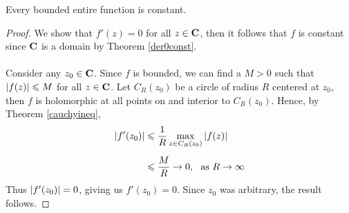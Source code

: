 \begin{theorem}\label{liouville}
Every bounded entire function is constant. 
\end{theorem}
\begin{proof}
We show that $f'(z) = 0$ for all $z \in \mathbf C$, then it follows that $f$ is constant since $\mathbf C$ is a domain by Theorem \ref{der0const}.\\
\\
Consider any $z_0 \in \mathbf C$. Since $f$ is bounded, we can find a $M>0$ such that $\left\lvert f(z)\right\rvert \leqslant M$ for all $z \in \mathbf C$. Let $C_R(z_0)$ be a circle of radius $R$ centered at $z_0$, then $f$ is holomorphic at all points on and interior to $C_R(z_0)$. Hence, by Theorem \ref{cauchyineq},
\begin{align*}
\left\lvert f'(z_0)\right\rvert &\leqslant \frac{1}{R}\max_{z \in C_R(z_0)}\left\lvert f(z)\right\rvert\\[0.5em]
&\leqslant \frac{M}{R} \to 0,\ \text{ as } R \to \infty
\end{align*}
Thus $\left\lvert f'(z_0)\right\rvert = 0$, giving us $f'(z_0) = 0$. Since $z_0$ was arbitrary, the result follows. 
\end{proof} 

\medskip

